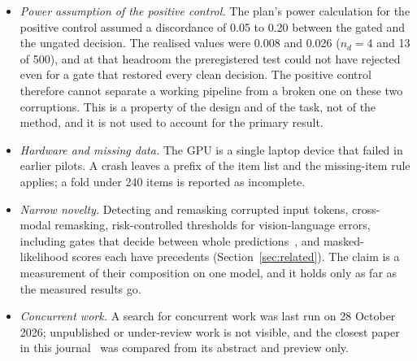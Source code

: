 \begin{itemize}
validate the pipeline. The conformal statement covers clean pairs only; on the unchanged tokens of swapped images the flag proportion
was 0.089, above $\alpha$, which the audit recorded and did not count as a defect.
\item \emph{Power assumption of the positive control.} The plan's power calculation for the positive control assumed a discordance of
0.05 to 0.20 between the gated and the ungated decision. The realised values were 0.008 and 0.026 ($n_d=4$ and 13 of 500), and at
that headroom the preregistered test could not have rejected even for a gate that restored every clean decision. The positive control
therefore cannot separate a working pipeline from a broken one on these two corruptions. This is a property of the design and of the
task, not of the method, and it is not used to account for the primary result.
\item \emph{Hardware and missing data.} The GPU is a single laptop device that failed in earlier pilots. A crash leaves a prefix of the item
list and the missing-item rule applies; a fold under 240 items is reported as incomplete.
\item \emph{Narrow novelty.} Detecting and remasking corrupted input tokens, cross-modal remasking, risk-controlled thresholds for
vision-language errors, including gates that decide between whole predictions~\cite{zhou2027burden}, and masked-likelihood scores
each have precedents (Section~\ref{sec:related}). The claim is a measurement of their composition on one model, and it holds only as
far as the measured results go.
\item \emph{Concurrent work.} A search for concurrent work was last run on 28 October 2026; unpublished or under-review work is not
visible, and the closest paper in this journal~\cite{zhou2027burden} was compared from its abstract and preview only.
\end{itemize}
